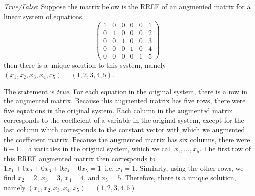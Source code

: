 \documentclass[11pt,letterpaper]{article}
\begin{document}
\quizsol \textit{True/False}: Suppose the matrix below is the RREF of an augmented matrix for a linear system of equations,
	\[
	\begin{pmatrix}
	1 & 0 & 0 & 0 & 0 & 1 \\
	0 & 1 & 0 & 0 & 0 & 2 \\
	0 & 0 & 1 & 0 & 0 & 3 \\
	0 & 0 & 0 & 1 & 0 & 4 \\
	0 & 0 & 0 & 0 & 1 & 5 
	\end{pmatrix}
	\]
then there is a unique solution to this system, namely $(x_1, x_2, x_3, x_4, x_5)= (1, 2, 3, 4, 5)$. \pspace

\sol The statement is \textit{true}. For each equation in the original system, there is a row in the augmented matrix. Because this augmented matrix has five rows, there were five equations in the original system. Each column in the augmented matrix corresponds to the coefficient of a variable in the original system, except for the last column which corresponds to the constant vector with which we augmented the coefficient matrix. Because the augmented matrix has six columns, there were $6 - 1= 5$ variables in the original system, which we call $x_1, \ldots, x_5$. The first row of this RREF augmented matrix then corresponds to $1x_1 + 0x_2 + 0x_3 + 0x_4 + 0x_5= 1$, i.e. $x_1= 1$. Similarly, using the other rows, we find $x_2= 2$, $x_3= 3$, $x_4= 4$, and $x_5= 5$. Therefore, there is a unique solution, namely $(x_1, x_2, x_3, x_4, x_5)= (1, 2, 3, 4, 5)$. 
\end{document}
